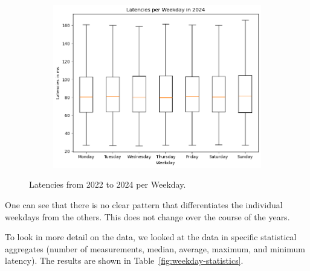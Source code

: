 \begin{figure}
\begin{subfigure}[b]{0.32\linewidth}
		\includegraphics[width=\linewidth]{chapters/4-results/latency/img/latency_2024_weekdays.png}
	\end{subfigure}
	\caption{Latencies from 2022 to 2024 per Weekday.}
	\label{fig:latencies-per-weekday}
\end{figure}

One can see that there is no clear pattern that differentiates the individual
weekdays from the others. This does not change over the course of the years.

To look in more detail on the data, we looked at the data in specific
statistical aggregates (number of measurements, median, average, maximum, and
minimum latency). The results are shown in Table~\ref{fig:weekday-statistics}.

